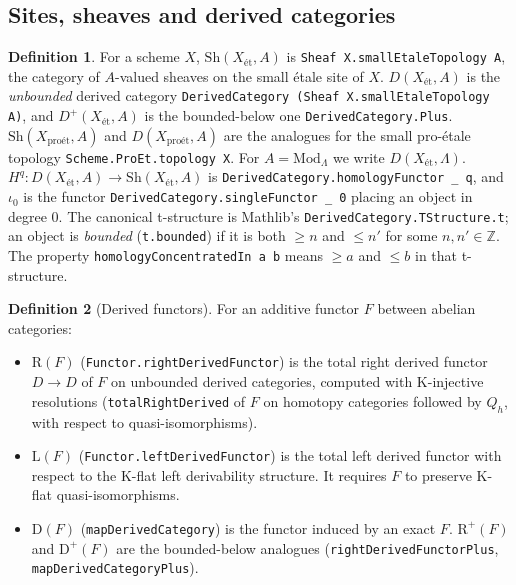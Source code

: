 \documentclass[10pt]{article}
\theoremstyle{definition}
\newtheorem{definition}{Definition}[section]
\theoremstyle{remark}
\newcommand{\lean}[1]{{\small\nolinkurl{#1}}}
\newcommand{\leanu}[1]{{\small\texttt{#1}}}
\newcommand{\et}{\text{\'et}}
\newcommand{\pet}{\text{pro\'et}}
\newcommand{\Sh}[2]{\mathrm{Sh}({#1}_{\et},#2)}
\newcommand{\ShP}[2]{\mathrm{Sh}({#1}_{\pet},#2)}
\newcommand{\D}[2]{D({#1}_{\et},#2)}
\newcommand{\Dp}[2]{D^{+}({#1}_{\et},#2)}
\newcommand{\DP}[2]{D({#1}_{\pet},#2)}
\newcommand{\Mod}{\mathrm{Mod}}
\begin{document}
\subsection{Sites, sheaves and derived categories}

\begin{definition}\label{def:sheaves}
For a scheme $X$, $\Sh{X}{A}$ is \leanu{Sheaf X.smallEtaleTopology A}, the category of
$A$-valued sheaves on the small étale site of $X$. $\D{X}{A}$ is the \emph{unbounded}
derived category \leanu{DerivedCategory (Sheaf X.smallEtaleTopology A)}, and $\Dp{X}{A}$ is
the bounded-below one \lean{DerivedCategory.Plus}. $\ShP{X}{A}$ and $\DP{X}{A}$ are the
analogues for the small pro-étale topology \leanu{Scheme.ProEt.topology X}. For
$A=\Mod_\Lambda$ we write $\D{X}{\Lambda}$. $H^q:\D{X}{A}\to\Sh{X}{A}$ is
\leanu{DerivedCategory.homologyFunctor \_ q}, and $\iota_0$ is the functor
\leanu{DerivedCategory.singleFunctor \_ 0} placing an object in degree $0$.
The canonical t-structure is Mathlib's \lean{DerivedCategory.TStructure.t}; an object is
\emph{bounded} (\lean{t.bounded}) if it is both $\ge n$ and $\le n'$ for some
$n,n'\in\mathbb Z$. The property \leanu{homologyConcentratedIn a b} means $\ge a$ and $\le b$ in
that t-structure.
\end{definition}

\begin{definition}[Derived functors]\label{def:derived}
For an additive functor $F$ between abelian categories:
\begin{itemize}
\item $\mathrm{R}(F)$ (\lean{Functor.rightDerivedFunctor}) is the total right derived
functor $D\to D$ of $F$ on unbounded derived categories, computed with K-injective
resolutions (\lean{totalRightDerived} of $F$ on homotopy categories followed by $Q_h$, with
respect to quasi-isomorphisms).
\item $\mathrm{L}(F)$ (\lean{Functor.leftDerivedFunctor}) is the total left derived functor
with respect to the K-flat left derivability structure. It requires $F$ to preserve K-flat
quasi-isomorphisms.
\item $\mathrm{D}(F)$ (\lean{mapDerivedCategory}) is the functor induced by an exact $F$.
$\mathrm{R}^{+}(F)$ and $\mathrm{D}^{+}(F)$ are the bounded-below analogues
(\lean{rightDerivedFunctorPlus}, \lean{mapDerivedCategoryPlus}).
\end{itemize}
\end{definition}
\end{document}
